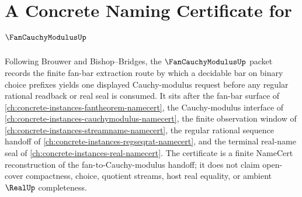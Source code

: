 \chapter{A Concrete Naming Certificate for $\FanCauchyModulusUp$}
\label{ch:concrete-instances-fan-cauchy-modulus-namecert}

Following Brouwer and Bishop--Bridges, the $\FanCauchyModulusUp$ packet records the finite fan-bar extraction route by which a decidable bar on binary choice prefixes yields one displayed Cauchy-modulus request before any regular rational readback or real seal is consumed. It sits after the fan-bar surface of \autoref{ch:concrete-instances-fantheorem-namecert}, the Cauchy-modulus interface of \autoref{ch:concrete-instances-cauchymodulus-namecert}, the finite observation window of \autoref{ch:concrete-instances-streamname-namecert}, the regular rational sequence handoff of \autoref{ch:concrete-instances-regseqrat-namecert}, and the terminal real-name seal of \autoref{ch:concrete-instances-real-namecert}. The certificate is a finite NameCert reconstruction of the fan-to-Cauchy-modulus handoff; it does not claim open-cover compactness, choice, quotient streams, host real equality, or ambient $\RealUp$ completeness.

